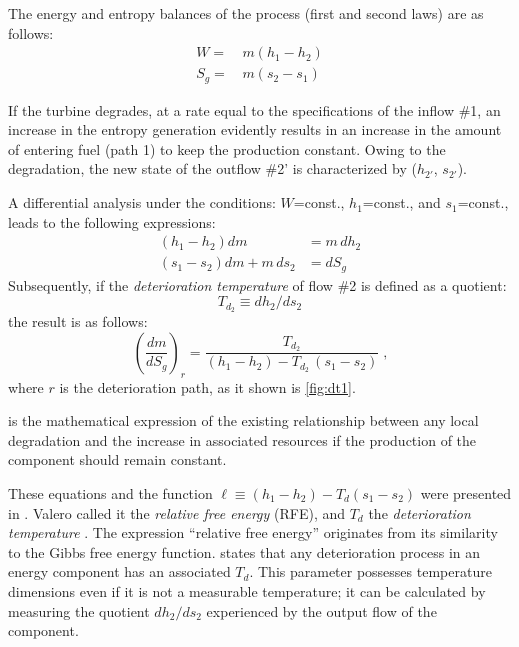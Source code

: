\documentclass[energies,article,submit,moreauthors,pdftex]{Definitions/mdpi}
\begin{document}
The energy and entropy balances of the process (first and second laws) are as follows:
\begin{align}
W=&\,m\left(h_1-h_2\right)\\
S_g=&\,m\left(s_2-s_1\right)
\end{align}

If the turbine degrades, at a rate equal to the specifications of the inflow \#1, an increase in the entropy generation evidently results in an increase in the amount of entering fuel (path 1) to keep the production constant. Owing to the degradation, the new state of the outflow \#2' is characterized by  ($h_{2'}$, $s_{2'}$).

A differential analysis under the conditions: $W$=const., $h_1$=const., and $s_1$=const., leads to the following expressions:
\begin{align}
\left(h_1-h_2\right) dm &= m \, dh_2\\
\left(s_1-s_2\right) dm + m \, ds_2 &= dS_g
\end{align}
Subsequently, if the \emph{deterioration temperature} of flow \#2 is defined as a quotient:
\[
T_{d_2}\equiv dh_2/ds_2
\]
the result is as follows:
\begin{equation}
\left(\frac{dm}{dS_g}\right)_r =\frac{T_{d_2}}{\left(h_1-h_2\right)-T_{d_2}\,\left(s_1-s_2\right)}\;\text{,}
\label{eq:dt2}
\end{equation}
where $r$ is the deterioration path, as it shown is \cref{fig:dt1}.

 is the mathematical expression of the existing relationship between any local degradation and the increase in associated resources if the production of the component should remain constant.

These equations and the function $\ell\equiv (h_1-h_2) - T_d (s_1 - s_2)$ were presented in \cite{Valero1992b}. Valero called it the \emph{relative free energy} (RFE), and $T_d$ the \emph{deterioration temperature} \cite{Royo1994,Royo1995}. The expression “relative free energy” originates from its similarity to the Gibbs free energy function.  states that any deterioration process in an energy component has an associated $T_d$. This parameter possesses temperature dimensions even if it is not a measurable temperature; it can be calculated by measuring the quotient $dh_2/ds_2$ experienced by the output flow of the component.
\end{document}
